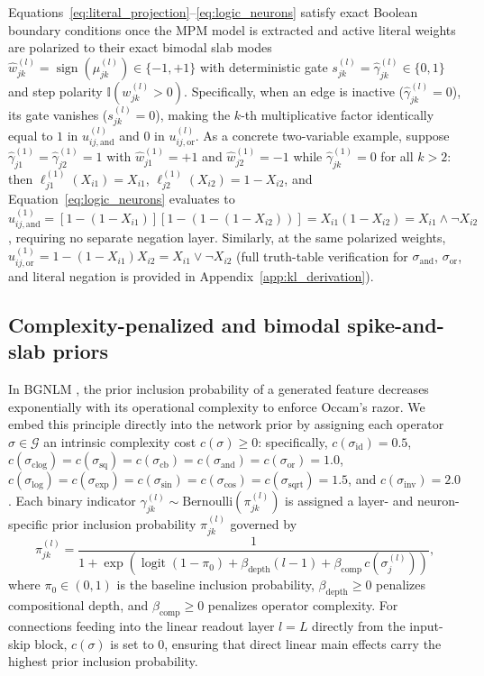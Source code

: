 \documentclass[11pt,a4paper]{article}
\begin{document}
Equations~\eqref{eq:literal_projection}--\eqref{eq:logic_neurons} satisfy exact Boolean boundary conditions once the MPM model is extracted and active literal weights are polarized to their exact bimodal slab modes $\hat{w}_{jk}^{(l)} = \operatorname{sign}(\mu_{jk}^{(l)}) \in \{-1, +1\}$ with deterministic gate $s_{jk}^{(l)} = \hat{\gamma}_{jk}^{(l)} \in \{0, 1\}$ and step polarity $\mathbb{I}(w_{jk}^{(l)} > 0)$. Specifically, when an edge is inactive ($\hat{\gamma}_{jk}^{(l)} = 0$), its gate vanishes ($s_{jk}^{(l)} = 0$), making the $k$-th multiplicative factor identically equal to $1$ in $u_{ij,\text{and}}^{(l)}$ and $0$ in $u_{ij,\text{or}}^{(l)}$. As a concrete two-variable example, suppose $\hat{\gamma}_{j1}^{(1)} = \hat{\gamma}_{j2}^{(1)} = 1$ with $\hat{w}_{j1}^{(1)} = +1$ and $\hat{w}_{j2}^{(1)} = -1$ while $\hat{\gamma}_{jk}^{(1)} = 0$ for all $k > 2$: then $\ell_{j1}^{(1)}(X_{i1}) = X_{i1}$, $\ell_{j2}^{(1)}(X_{i2}) = 1 - X_{i2}$, and Equation~\eqref{eq:logic_neurons} evaluates to $u_{ij,\text{and}}^{(1)} = [1 - (1 - X_{i1})][1 - (1 - (1 - X_{i2}))] = X_{i1}(1 - X_{i2}) = X_{i1} \land \neg X_{i2}$, requiring no separate negation layer. Similarly, at the same polarized weights, $u_{ij,\text{or}}^{(1)} = 1 - (1 - X_{i1})X_{i2} = X_{i1} \lor \neg X_{i2}$ (full truth-table verification for $\sigma_{\text{and}}$, $\sigma_{\text{or}}$, and literal negation is provided in Appendix~\ref{app:kl_derivation}).

\subsection{Complexity-penalized and bimodal spike-and-slab priors}
\label{sec:methods:priors}

In BGNLM \citep{hubin2021bgnlm}, the prior inclusion probability of a generated feature decreases exponentially with its operational complexity to enforce Occam's razor. We embed this principle directly into the network prior by assigning each operator $\sigma \in \mathcal{G}$ an intrinsic complexity cost $c(\sigma) \ge 0$: specifically, $c(\sigma_{\text{id}}) = 0.5$, $c(\sigma_{\text{clog}}) = c(\sigma_{\text{sq}}) = c(\sigma_{\text{cb}}) = c(\sigma_{\text{and}}) = c(\sigma_{\text{or}}) = 1.0$, $c(\sigma_{\log}) = c(\sigma_{\exp}) = c(\sigma_{\sin}) = c(\sigma_{\cos}) = c(\sigma_{\text{sqrt}}) = 1.5$, and $c(\sigma_{\text{inv}}) = 2.0$. Each binary indicator $\gamma_{jk}^{(l)} \sim \mathrm{Bernoulli}(\pi_{jk}^{(l)})$ is assigned a layer- and neuron-specific prior inclusion probability $\pi_{jk}^{(l)}$ governed by
\begin{equation}
\label{eq:symbolic_prior}
\pi_{jk}^{(l)} = \frac{1}{1 + \exp\!\left(\operatorname{logit}(1 - \pi_0) + \beta_{\text{depth}}(l - 1) + \beta_{\text{comp}}\,c(\sigma_j^{(l)})\right)},
\end{equation}
where $\pi_0 \in (0, 1)$ is the baseline inclusion probability, $\beta_{\text{depth}} \ge 0$ penalizes compositional depth, and $\beta_{\text{comp}} \ge 0$ penalizes operator complexity. For connections feeding into the linear readout layer $l = L$ directly from the input-skip block, $c(\sigma)$ is set to $0$, ensuring that direct linear main effects carry the highest prior inclusion probability.
\end{document}
